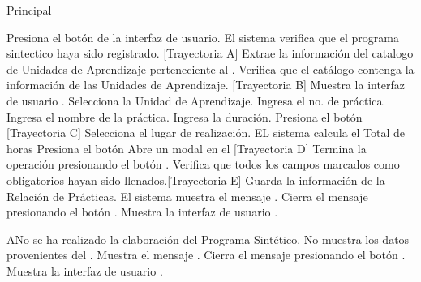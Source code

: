 \begin{UCtrayectoria}{Principal}

    \UCpaso[\UCactor] Presiona el botón  de la interfaz de usuario. 
    \UCpaso El sistema verifica que el programa sintectico haya sido registrado. [Trayectoria A]
    \UCpaso Extrae la información del catalogo de Unidades de Aprendizaje perteneciente al . 
    \UCpaso Verifica que el catálogo contenga la información de las Unidades de Aprendizaje. [Trayectoria B]
    \UCpaso Muestra la interfaz de usuario .
    \UCpaso[\UCactor] Selecciona la Unidad de Aprendizaje.
    \UCpaso[\UCactor] Ingresa el no. de práctica.
    \UCpaso[\UCactor] Ingresa el nombre de la práctica.
    \UCpaso[\UCactor] Ingresa la duración.
    \UCpaso[\UCactor] Presiona el botón  [Trayectoria C]
    \UCpaso[\UCactor] Selecciona el lugar de realización.
    \UCpaso EL sistema calcula el Total de horas %
    \UCpaso[\UCactor] Presiona el botón 
    \UCpaso Abre un modal en el  [Trayectoria D]
    \UCpaso[\UCactor] Termina la operación presionando el botón . 
    \UCpaso Verifica que todos los campos marcados como obligatorios hayan sido llenados.[Trayectoria E]
    \UCpaso Guarda la información de la Relación de Prácticas.
    \UCpaso El sistema muestra el mensaje .
    \UCpaso[\UCactor] Cierra el mensaje presionando el botón .
    \UCpaso Muestra la interfaz de usuario .
\end{UCtrayectoria}


\begin{UCtrayectoriaA}{A}{No se ha realizado la elaboración del Programa Sintético}.
	\UCpaso No muestra los datos provenientes del .
	\UCpaso Muestra el mensaje .
	\UCpaso[\UCactor] Cierra el mensaje presionando el botón .
	\UCpaso Muestra la interfaz de usuario .
\end{UCtrayectoriaA}


